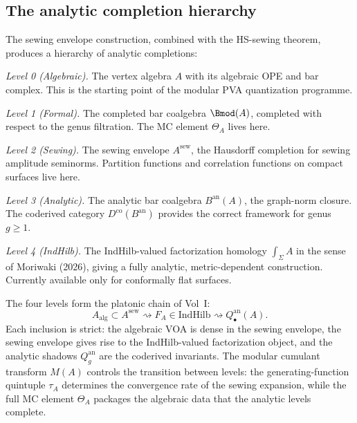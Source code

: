 \subsection{The analytic completion hierarchy}

\begin{construction}
The sewing envelope construction, combined with the HS-sewing theorem,
produces a hierarchy of analytic completions:

\smallskip
\noindent
\emph{Level 0 (Algebraic).}
The vertex algebra $A$ with its algebraic OPE and bar complex.
This is the starting point of the modular PVA quantization programme.

\smallskip
\noindent
\emph{Level 1 (Formal).}
The completed bar coalgebra $\Bmod(A)$, completed with respect to
the genus filtration. The MC element $\Theta_A$ lives here.

\smallskip
\noindent
\emph{Level 2 (Sewing).}
The sewing envelope $A^{\mathrm{sew}}$, the Hausdorff completion for
sewing amplitude seminorms. Partition functions and correlation
functions on compact surfaces live here.

\smallskip
\noindent
\emph{Level 3 (Analytic).}
The analytic bar coalgebra $B^{\mathrm{an}}(A)$, the graph-norm
closure. The coderived category $D^{\mathrm{co}}(B^{\mathrm{an}})$
provides the correct framework for genus $g \ge 1$.

\smallskip
\noindent
\emph{Level 4 (IndHilb).}
The IndHilb-valued factorization homology $\int_\Sigma A$ in the
sense of Moriwaki (2026), giving a fully analytic, metric-dependent
construction. Currently available only for conformally flat surfaces.
\end{construction}

\begin{remark}
The four levels form the platonic chain of
Vol~I:
\[
A_{\mathrm{alg}} \subset A^{\mathrm{sew}}
\rightsquigarrow F_A \in \mathrm{IndHilb}
\rightsquigarrow Q_\bullet^{\mathrm{an}}(A).
\]
Each inclusion is strict: the algebraic VOA is dense in the sewing
envelope, the sewing envelope gives rise to the IndHilb-valued
factorization object, and the analytic shadows $Q_g^{\mathrm{an}}$
are the coderived invariants. The modular cumulant transform $M(A)$
controls the transition between levels: the generating-function
quintuple $\tau_A$ determines the convergence rate of the sewing
expansion, while the full MC element $\Theta_A$ packages the
algebraic data that the analytic levels complete.
\end{remark}

